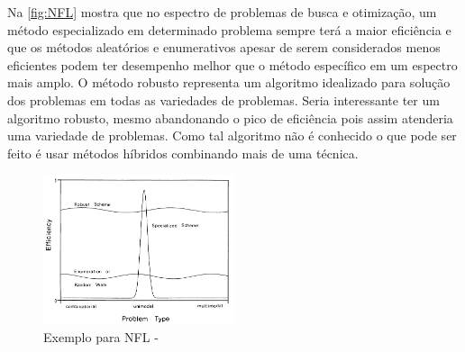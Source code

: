 Na \autoref{fig:NFL} \citeauthor{Goldberg1989} mostra que no espectro de problemas de busca e otimização, um método especializado em determinado problema sempre terá a maior eficiência e que os métodos aleatórios e enumerativos apesar de serem considerados menos eficientes podem ter desempenho melhor que o método específico em um espectro mais amplo. O método robusto representa um algoritmo idealizado para solução dos problemas em todas as variedades de problemas. Seria interessante ter um algoritmo robusto, mesmo abandonando o pico de eficiência pois assim atenderia uma variedade de problemas. Como tal algoritmo não é conhecido o que pode ser feito é usar métodos híbridos combinando mais de uma técnica.

\begin{figure}
	\begin{center}
		\includegraphics[width=0.5\textwidth]{imagens/David_NFL_Theorem.png}
		\caption{Exemplo para NFL - \cite{Goldberg1989}}
		\label{fig:NFL}
	\end{center}
\end{figure}
